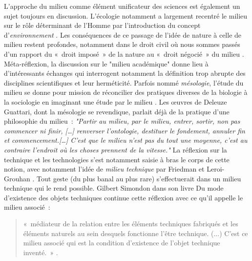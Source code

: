 L’approche du milieu comme élément unificateur des sciences est également un sujet toujours en discussion. L’écologie notamment a largement recentré le milieu sur le rôle déterminant de l’Homme par l’introduction du concept d’\textit{environnement} \citep{Gandalfo2008}. Les conséquences de ce passage de l’idée de nature à celle de milieu restent profondes, notamment dans le droit civil où nous sommes passés d’un rapport du « droit imposé » de la nature au « droit négocié » du milieu \citep{Papaux2008}. Méta-réflexion, la discussion sur le "milieu académique" donne lieu à d’intéressants échanges \citep{Stengers2009} qui interrogent notamment la définition trop abrupte des disciplines scientifiques et leur herméticité. Parfois nommé \textit{mésologie}, l’étude du milieu se donne pour mission de réconcilier des pratiques diverses de la biologie à la sociologie en imaginant une étude par le milieu \citep{Stengers2003}. Les œuvres de Deleuze  Guattari, dont la mésologie se revendique, parlait déjà de la pratique d’une philosophie du milieu : \textit{"Partir au milieu, par le milieu, entrer, sortir, non pas commencer ni ﬁnir, […] renverser l'ontologie, destituer le fondement, annuler ﬁn et commencement.[…] C'est que le milieu n'est pas du tout une moyenne, c'est au contraire l'endroit où les choses prennent de la vitesse."} \citep{Deleuze1972} 
La réflexion sur la technique et les technologies s’est notamment saisie à bras le corps de cette notion, avec notamment l’idée de \textit{milieu technique} par Friedman et Leroi-Grouhan \citep{Stiegler1998}. Tout geste (du plus banal au plus rare) s’effectuerait dans un milieu technique qui le rend possible. Gilbert Simondon dans son livre Du mode d’existence des objets techniques continue cette réflexion avec ce qu’il appelle le milieu associé : 
\begin{quote}
« médiateur de la relation entre les éléments techniques fabriqués et les éléments 	naturels au sein desquels fonctionne l’être technique. (...) C’est ce milieu associé 	qui est la condition d’existence de l’objet technique inventé. » \citep{Simondon1989}. 
\end{quote}
